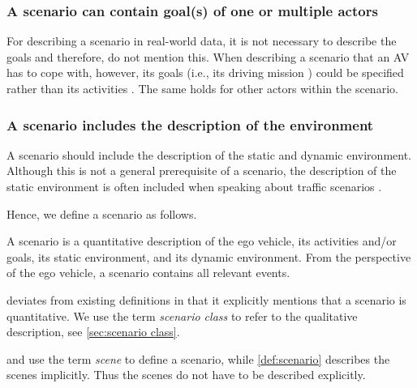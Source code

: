 \subsubsection{A scenario can contain goal(s) of one or multiple actors}
For describing a scenario in real-world data, it is not necessary to describe the goals and therefore, \textcite{elrofai2016scenario} do not mention this. When describing a scenario that an AV has to cope with, however, its goals (i.e., its driving mission \cite{geyer2014}) could be specified rather than its activities \cite{ulbrich2015}. The same holds for other actors within the scenario.

\subsubsection{A scenario includes the description of the environment}
A scenario should include the description of the static and dynamic environment.
Although this is not a general prerequisite of a scenario, the description of the static environment is often included when speaking about traffic scenarios \cite{geyer2014, ulbrich2015, elrofai2016scenario, ebner2011identifying, schuldt2013effiziente, althoff2017CommonRoad}.

Hence, we define a scenario as follows.
\begin{definition}[Scenario]\label{def:scenario}
	A scenario is a quantitative description of the ego vehicle, its activities and/or goals, its static environment, and its dynamic environment. From the perspective of the ego vehicle, a scenario contains all relevant events.
\end{definition}

 deviates from existing definitions \cite{geyer2014, ulbrich2015, elrofai2016scenario} in that it explicitly mentions that a scenario is quantitative. We use the term \emph{scenario class} to refer to the qualitative description, see \cref{sec:scenario class}.

\textcite{geyer2014} and \textcite{ulbrich2015} use the term \emph{scene} to define a scenario, while \cref{def:scenario} describes the scenes implicitly. Thus the scenes do not have to be described explicitly.

